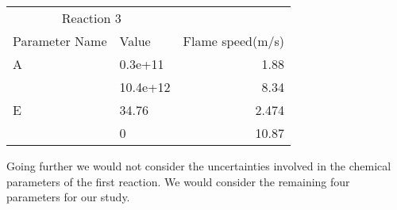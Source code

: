   
     \begin{tabular}{llr}  
    \toprule
    \multicolumn{2}{c}{Reaction 3} \\
    \cmidrule(r){1-2}
    Parameter Name  & Value &  Flame speed(m/s)\\
    \midrule
    A      & 0.3e+11    & 1.88      \\
           &  10.4e+12     & 8.34       \\
   
    E      & 34.76    & 2.474      \\
           &   0     & 10.87       \\
    
    \bottomrule
  \end{tabular}

 Going further we would not consider the uncertainties involved in the
 chemical parameters of the first reaction. We would consider the
 remaining four parameters for our study.
